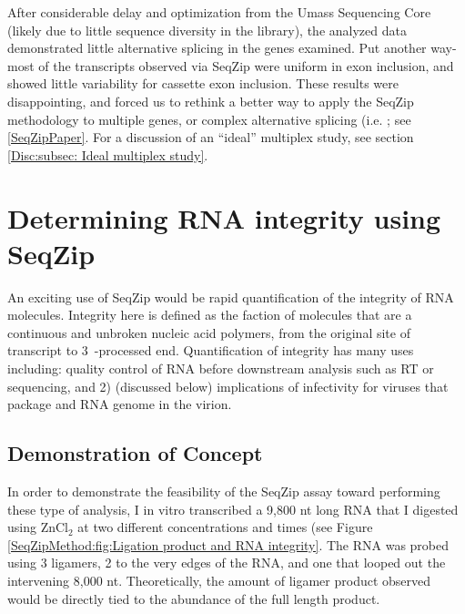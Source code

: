   After considerable delay and optimization from the Umass Sequencing Core (likely due to little sequence diversity in the library), the analyzed data demonstrated little alternative splicing in the genes examined. Put another way- most of the transcripts observed via SeqZip were uniform in exon inclusion, and showed little variability for cassette exon inclusion. These results were disappointing, and forced us to rethink a better way to apply the SeqZip methodology to multiple genes, or complex alternative splicing (i.e. \dscam{}; see \ref{SeqZipPaper}. For a discussion of an ``ideal'' multiplex study, see section \ref{Disc:subsec: Ideal multiplex study}.

\section{Determining RNA integrity using SeqZip}\label{SeqZipMethod:sec:RNA Integrity via SeqZip}

  An exciting use of SeqZip would be rapid quantification of the integrity of RNA molecules. Integrity here is defined as the faction of molecules that are a continuous and unbroken nucleic acid polymers, from the original site of transcript to 3\textprime~-processed end. Quantification of integrity has many uses including: quality control of RNA before downstream analysis such as RT or sequencing, and 2) (discussed below) implications of infectivity for viruses that package and RNA genome in the virion.

  \subsection{Demonstration of Concept}\label{SeqZipMethod:subsec:SeqZip can be used to examine viral genomes}

    In order to demonstrate the feasibility of the SeqZip assay toward performing these type of analysis, I in vitro transcribed a 9,800 nt long RNA that I digested using ZnCl$_{2}$ at two different concentrations and times (see Figure \ref{SeqZipMethod:fig:Ligation product and RNA integrity}. The RNA was probed using 3 ligamers, 2 to the very edges of the RNA, and one that looped out the intervening 8,000 nt. Theoretically, the amount of ligamer product observed would be directly tied to the abundance of the full length product.

